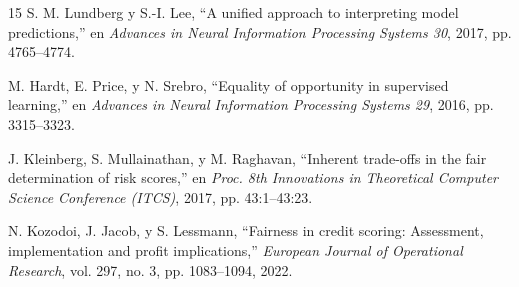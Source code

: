 \documentclass[journal]{IEEEtran}
\begin{document}
\begin{thebibliography}{15}
S. M. Lundberg y S.-I. Lee, ``A unified approach to interpreting model predictions,'' en \textit{Advances in Neural Information Processing Systems 30}, 2017, pp. 4765--4774.

M. Hardt, E. Price, y N. Srebro, ``Equality of opportunity in supervised learning,'' en \textit{Advances in Neural Information Processing Systems 29}, 2016, pp. 3315--3323.

J. Kleinberg, S. Mullainathan, y M. Raghavan, ``Inherent trade-offs in the fair determination of risk scores,'' en \textit{Proc. 8th Innovations in Theoretical Computer Science Conference (ITCS)}, 2017, pp. 43:1--43:23.

N. Kozodoi, J. Jacob, y S. Lessmann, ``Fairness in credit scoring: Assessment, implementation and profit implications,'' \textit{European Journal of Operational Research}, vol. 297, no. 3, pp. 1083--1094, 2022.

\end{thebibliography}
\end{document}
